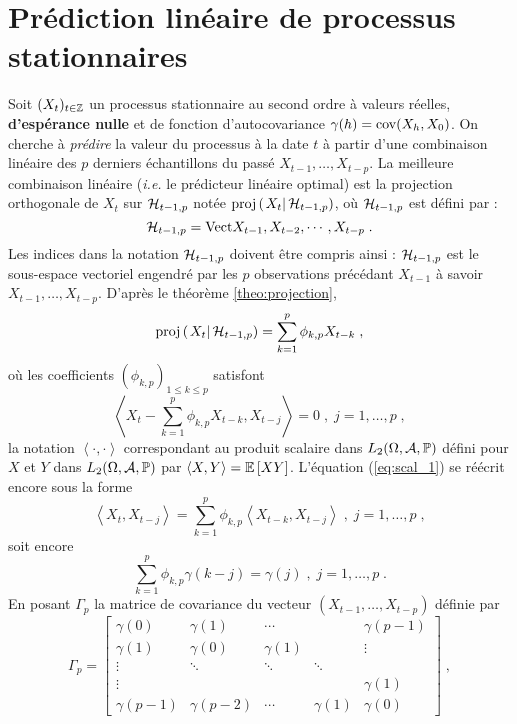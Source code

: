 \section{Pr\'ediction lin\'eaire de processus stationnaires}
Soit $(X_t)_{t\in\mathbb{Z}}$ un processus stationnaire au
second ordre \`a valeurs r\'eelles, \textbf{d'esp\'erance nulle} et de fonction
d'autocovariance $\gamma(h)= \mathrm{cov}(X_h,X_0)$. On cherche \`a
\emph{pr\'edire} la valeur du processus \`a la date $t$ \`a partir
d'une combinaison lin\'eaire des $p$ derniers \'echantillons du pass\'e
$X_{t-1}, \dots, X_{t-p}$. La meilleure combinaison lin\'eaire
(\textit{i.e.} le pr\'edicteur lin\'eaire optimal)
est la projection orthogonale de $X_t$ sur
$\mathcal{H}_{t-1,p}$  not\'ee $\proj{X_t}{\cH_{t-1,p}}$, o\`u $\mathcal{H}_{t-1,p}$ est
d\'efini par :
\begin{equation}
\label{eq:cht}
\mathcal{H}_{t-1,p} = \mathrm{Vect}{X_{t-1}, X_{t-2}, \cdots, X_{t-p}}\;.
\end{equation}
Les indices dans la notation $\mathcal{H}_{t-1,p}$ doivent \^{e}tre compris ainsi
: $\mathcal{H}_{t-1,p}$ est le sous-espace vectoriel engendr\'e par les
$p$ observations pr\'ec\'edant $X_{t-1}$ \`a savoir
$X_{t-1}, \dots, X_{t-p}$.
D'apr\`es le th\'eor\`eme \ref{theo:projection},
\begin{equation}\label{eq:def_phi_kp}
\proj{X_t}{\cH_{t-1,p}}=\sum_{k=1}^p \phi_{k,p} X_{t-k}\;,
\end{equation}
o\`u les coefficients $(\phi_{k,p})_{1\leq k\leq p}$ satisfont
\begin{equation}\label{eq:scal_1}
\left\langle X_t-\sum_{k=1}^p \phi_{k,p} X_{t-k},X_{t-j}\right\rangle=0\;,\;
j=1,\dots,p\;,
\end{equation}
la notation $\left\langle \cdot,\cdot\right\rangle$ correspondant au
produit scalaire dans $L_2(\Omega,\mathcal{A},\mathbb{P})$ d\'efini pour $X$ et $Y$
dans $L_2(\Omega,\mathcal{A},\mathbb{P})$ par  $\left\langle X,Y\right\rangle={\mathbb E}\left[ XY \right]$.
L'\'equation (\ref{eq:scal_1}) se r\'e\'ecrit encore sous la forme
\begin{equation}\label{eq:scal_2}
\left\langle X_t,X_{t-j}\right\rangle=\sum_{k=1}^p \phi_{k,p}
\left\langle  X_{t-k},X_{t-j}\right\rangle\;,\;
j=1,\dots,p\;,
\end{equation}
soit encore
\begin{equation}\label{eq:scal_3}
\sum_{k=1}^p \phi_{k,p}\gamma(k-j)=\gamma(j)\;,\;
j=1,\dots,p\;.
\end{equation}
En posant $\Gamma_p$ la matrice de covariance
du vecteur $(X_{t-1},\dots, X_{t-p})$ d\'efinie par
\begin{equation*}
\Gamma_p =
 \left[
 \begin{matrix}
  \gamma(0)  & \gamma(1)  &  \cdots    &            & \gamma(p-1) \\
  \gamma(1)  & \gamma(0)  &  \gamma(1) &            & \vdots \\
  \vdots     &\ddots      &  \ddots    &  \ddots    &     \\
  \vdots     &            &            &            &\gamma(1)  \\
  \gamma(p-1)& \gamma(p-2)&  \cdots    & \gamma(1)  & \gamma(0)
 \end{matrix}
 \right]\;,
\end{equation*}
